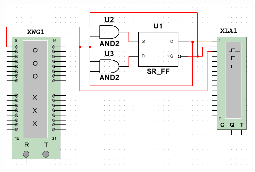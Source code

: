 \documentclass{article}
\begin{document}
            \begin{center}
                \includegraphics[width=18cm]{reports/img/Z2B_1.png}\\
            \end{center}
            
\end{document}
